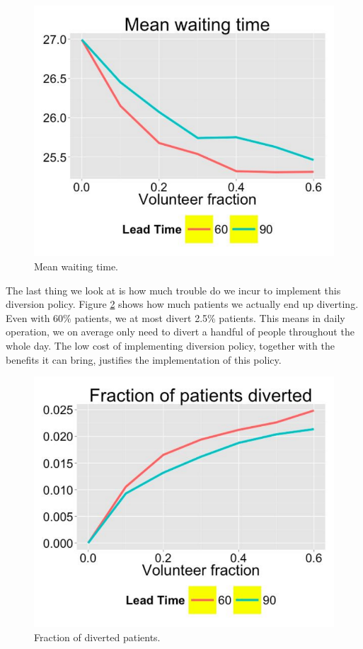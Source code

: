 \begin{figure}
\centering
\includegraphics[width=.9\textwidth]{chap3/pic/mean_waiting.pdf}
\caption{Mean waiting time.}
\label{fig:mean_waiting}
\end{figure}

The last thing we look at is how much trouble do we incur to
implement this diversion policy. Figure \ref{fig:fraction}
shows how much patients we actually end up diverting. Even with
60\% patients, we at most divert 2.5\% patients. This means
in daily operation, we on average only need to divert a handful
of people throughout the whole day. The low cost of implementing
diversion policy, together with the benefits it can bring, justifies
the implementation of this policy.

\begin{figure}
\centering
\includegraphics[width=.9\textwidth]{chap3/pic/fraction.pdf}
\caption{Fraction of diverted patients.}
\label{fig:fraction}
\end{figure}
